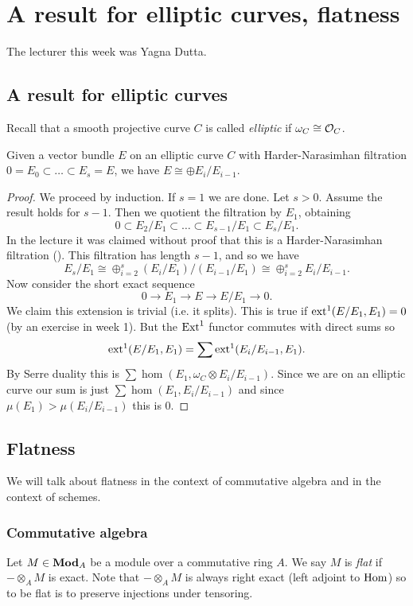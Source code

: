 \chapter{A result for elliptic curves, flatness}
The lecturer this week was Yagna Dutta.
\section{A result for elliptic curves}
Recall that a smooth projective curve $C$ is called \emph{elliptic} if $\omega_C \cong \mathcal{O}_C$. 
\begin{proposition}
	Given a vector bundle $E$ on an elliptic curve $C$ with Harder-Narasimhan filtration $0 = E_0 \subset \dots \subset E_s = E$, we have $E \cong \oplus E_i/E_{i-1}$. 
\end{proposition}
\begin{proof}
	We proceed by induction. If $s = 1$ we are done. 
	Let $s > 0$. Assume the result holds for $s-1$. Then we quotient the filtration by $E_1$, obtaining \[
    	0 \subset E_2/E_1 \subset \dots \subset E_{s-1}/E_1 \subset E_s/E_1.
    \] In the lecture it was claimed without proof that this is a Harder-Narasimhan filtration (). This filtration has length $s-1$, and so we have \[E_s/E_1 \cong \oplus^s_{i=2} (E_i/E_1)/(E_{i-1}/E_1) \cong \oplus^s_{i=2} E_i/E_{i-1}.\]
	Now consider the short exact sequence \[
    	0 \to E_1 \to E \to E/E_1 \to 0.
    \] We claim this extension is trivial (i.e. it splits). This is true if $\operatorname{ext}^1(E/E_1, E_1) = 0$ (by an exercise in week 1). But the $\operatorname{Ext}^1$ functor commutes with direct sums so \[
    	\operatorname{ext}^1(E/E_1, E_1) = \sum \operatorname{ext}^1(E_i/E_{i-1}, E_1).
    \] By Serre duality  this is $\sum \hom(E_1, \omega_C \otimes E_i/E_{i-1})$. Since we are on an elliptic curve our sum is just $\sum \hom(E_1, E_i/E_{i-1})$ and since $\mu(E_1) > \mu(E_i/E_{i-1})$ this is $0$.
\end{proof}
\section{Flatness}
We will talk about flatness in the context of commutative algebra and in the context of schemes. 

\subsection{Commutative algebra}
\begin{definition}\label{def:flatness}
	Let $M \in \mathbf{Mod}_A$ be a module over a commutative ring $A$. We say $M$ is \emph{flat} if $-\otimes_A M$ is exact. Note that $-\otimes_A M$ is always right exact (left adjoint to $\operatorname{Hom}$) so to be flat is to preserve injections under tensoring.
\end{definition}


